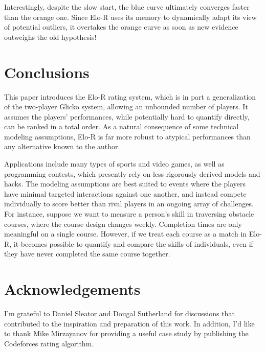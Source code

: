 \documentclass{article}
\begin{document}
Interestingly, despite the slow start, the blue curve ultimately converges faster than the orange one. Since Elo-R uses its memory to dynamically adapt its view of potential outliers, it overtakes the orange curve as soon as new evidence outweighs the old hypothesis!

\section{Conclusions}

This paper introduces the Elo-R rating system, which is in part a generalization of the two-player Glicko system, allowing an unbounded number of players. It assumes the players' performances, while potentially hard to quantify directly, can be ranked in a total order. As a natural consequence of some technical modeling assumptions, Elo-R is far more robust to atypical performances than any alternative known to the author.

Applications include many types of sports and video games, as well as programming contests, which presently rely on less rigorously derived models and hacks. The modeling assumptions are best suited to events where the players have minimal targeted interactions against one another, and instead compete individually to score better than rival players in an ongoing array of challenges. For instance, suppose we want to measure a person's skill in traversing obstacle courses, where the course design changes weekly. Completion times are only meaningful on a single course. However, if we treat each course as a match in Elo-R, it becomes possible to quantify and compare the skills of individuals, even if they have never completed the same course together.

\section*{Acknowledgements}

I'm grateful to Daniel Sleator and Dougal Sutherland for discussions that contributed to the inspiration and preparation of this work. In addition, I'd like to thank Mike Mirzayanov for providing a useful case study by publishing the Codeforces rating algorithm.



\end{document}
